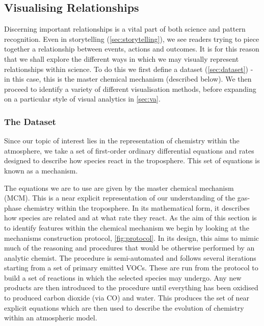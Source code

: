 \subsection{Visualising Relationships}\label{sec:visrel}

Discerning important relationships is a vital part of both science and pattern recognition. Even in storytelling (\autoref{sec:storytelling}), we see readers trying to piece together a relationship between events, actions and outcomes. It is for this reason that we shall explore the different ways in which we may visually represent relationships within science. To do this we first define a dataset (\autoref{sec:dataset}) - in this case, this is the master chemical mechanism (described below). We then proceed to identify a variety of different visualisation methods, before expanding on a particular style of visual analytics in \autoref{sec:va}.

\subsubsection{The Dataset}\label{sec:dataset}
Since our topic of interest lies in the representation of chemistry within the atmosphere, we take a set of first-order ordinary differential equations and rates designed to describe
how species react in the troposphere. This set of equations is known as a mechanism. 

The equations we are to use are given by the master chemical mechanism (MCM). This is a near explicit representation of our understanding of the gas-phase chemistry within the troposphere. In its mathematical form, it describes how species are related and at what rate they react. As the aim of this section is to identify features within the chemical mechanism we begin by looking at the mechanisms construction protocol, \autoref{fig:protocol}. In its design, this aims to mimic much of the reasoning and procedures that would be otherwise performed by an analytic chemist. The procedure is semi-automated and follows several iterations starting from a set of primary emitted VOCs. These are run from the protocol to build a set of reactions in which the selected species may undergo. Any new products are then introduced to the procedure until everything has been oxidised to produced carbon dioxide (via CO) and water. This produces the set of near explicit equations which are then used to describe the evolution of chemistry within an atmospheric model. 

